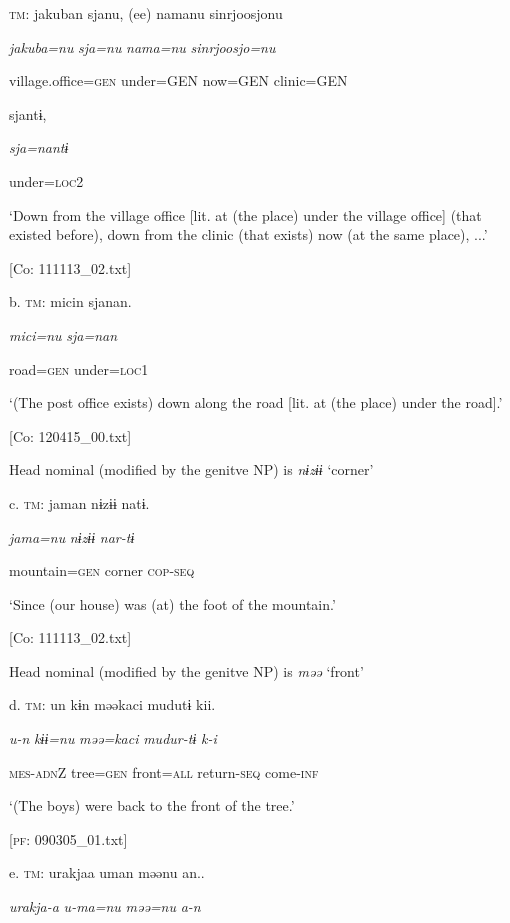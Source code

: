     \textsc{tm}:  jakuban  sjanu,  (ee)  namanu  {\textbar}sinrjoosjo{\textbar}nu

      \textit{jakuba=nu}  \textit{sja=nu}    \textit{nama=nu}  \textit{sinrjoosjo=nu}

      village.office=\textsc{gen}  under=GEN    now=GEN  clinic=GEN

      sjantɨ,

      \textit{sja=nantɨ}

      under=\textsc{loc}2

      ‘Down from the village office [lit. at (the place) under the village office] (that existed before), down from the clinic (that exists) now (at the same place), ...’

      [Co: 111113\_02.txt]

  b.  \textsc{tm}:  micin  sjanan.

      \textit{mici=nu}  \textit{sja=nan}

      road=\textsc{gen}  under=\textsc{loc}1

      ‘(The post office exists) down along the road [lit. at (the place) under the road].’

      [Co: 120415\_00.txt]

  Head nominal (modified by the genitve NP) is \textit{nɨzɨɨ} ‘corner’

  c.  \textsc{tm}:  jaman  nɨzɨɨ  natɨ.

      \textit{jama=nu}  \textit{nɨzɨɨ}  \textit{nar-tɨ}

      mountain=\textsc{gen}  corner  \textsc{cop}-\textsc{seq}

      ‘Since (our house) was (at) the foot of the mountain.’

      [Co: 111113\_02.txt]

  Head nominal (modified by the genitve NP) is \textit{məə} ‘front’

  d.  \textsc{tm}:  un  kɨn  məəkaci  mudutɨ  kii.

      \textit{u-n}  \textit{kɨɨ=nu}  \textit{məə=kaci}  \textit{mudur-tɨ}  \textit{k-i}

      \textsc{mes}-\textsc{adn}Z  tree=\textsc{gen}  front=\textsc{all}  return-\textsc{seq}  come-\textsc{inf}

      ‘(The boys) were back to the front of the tree.’

      [\textsc{pf}: 090305\_01.txt]

  e.  \textsc{tm}:  urakjaa  uman  məənu  an..

      \textit{urakja-a}  \textit{u-ma=nu}  \textit{məə=nu}  \textit{a-n}

